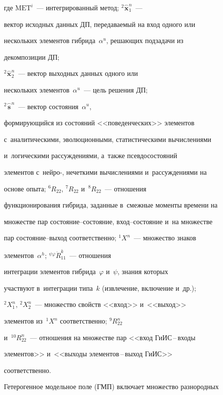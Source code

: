 где $\mathrm{MET}^i$~--- интегрированный метод; ${}^2\overset{\frown}{\mathbf{x}}_1^n$~--- 

вектор исходных данных ДП, пе\-ре\-да\-ва\-емый на вход одного или 

нескольких элементов гиб\-ри\-да~$\alpha^u$, ре\-ша\-ющих подзадачи из 

декомпозиции ДП;  

${}^2\overset{\frown}{\mathbf{x}}_2^n$~--- вектор выходных данных одного или 

нескольких элементов~$\alpha^u$~--- цель решения ДП; 

${}^2\overset{\frown}{\mathbf{s}}^n$~--- вектор со\-сто\-яния~$\alpha^u$, 

формирующийся из со\-сто\-яний <<поведенческих>> элементов 

с~аналитическими, эволюционными, статистическими вычислениями 

и~логическими рас\-суж\-де\-ни\-ями, а~так\-же псев\-до\-со\-сто\-яний 

элементов с~ней\-ро-, нечеткими вы\-чис\-ле\-ни\-ями и~рассуждениями на 

основе опыта; ${}^6 R_{22}$, ${}^7 R_{22}$ и~${}^8 R_{22}$~--- отношения 

функционирования гиб\-ри\-да, заданные в~смежные моменты времени на 

множестве пар со\-сто\-яние--со\-сто\-яние, вход--со\-сто\-яние и~на множестве 

пар со\-сто\-яние--вы\-ход соответственно; ${}^1X^n$~--- множество знаков 

элементов~$\alpha^h$; ${}^{\psi\varphi}\ddot{R}^k_{11}$~--- отношения 

интеграции элементов гиб\-ри\-да~$\varphi$ и~$\psi$, знания которых  

участ\-ву\-ют в~интеграции типа~$k$ (извлечение, включение и~др.); 

${}^2X_1^n$, ${}^2X_2^n$~--- множество свойств <<вход>> и~<<выход>> 

элементов из~${}^1X^n$ соответственно; ${}^9R^n_{22}$ 

и~${}^{10}R^n_{22}$~--- отношения на множестве пар <<вход \mbox{ГиИС}\,--\,вхо\-ды 

элементов>> и~<<выходы эле\-мен\-тов\,--\,вы\-ход \mbox{ГиИС}>> 

соответственно.

  

  Гетерогенное модельное поле (ГМП) включает множество разнородных 

